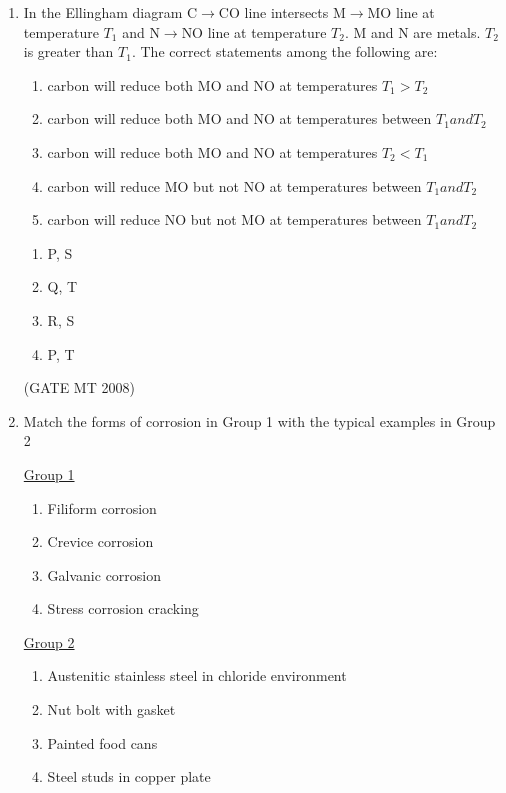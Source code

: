 \documentclass[11pt, letterpaper]{article}
\theoremstyle{remark}
\begin{document}
\begin{enumerate}
\item In the Ellingham diagram C$\rightarrow$CO line intersects M$\rightarrow$MO line at temperature $T_1$ and N$\rightarrow$NO line at temperature $T_2$. M and N are metals. $T_2$ is greater than $T_1$. The correct statements among the following are:
\begin{enumerate}[label=(\MakeUppercase{\alph*}), start= 16]
\item carbon will reduce both MO and NO at temperatures $T_1 > T_2$
\item carbon will reduce both MO and NO at temperatures between $T_1 and T_2$
\item carbon will reduce both MO and NO at temperatures $T_2 < T_1$
\item carbon will reduce MO but not NO at temperatures between $T_1 and T_2$
\item carbon will reduce NO but not MO at temperatures between $T_1 and T_2$
\end{enumerate}

\begin{multicols}{2}
\begin{enumerate} 
\item P, S
\item Q, T
\item R, S
\item P, T
\end{enumerate}
\end{multicols}
\hfill(GATE MT 2008)

\item Match the forms of corrosion in Group 1 with the typical examples in Group 2
\begin{multicols}{2}
\underline{Group 1}
\begin{enumerate}[label=(\Alph*), start=16]
\item Filiform corrosion  
\item Crevice corrosion
\item Galvanic corrosion
\item Stress corrosion cracking 
\end{enumerate}

\underline{Group 2}
\begin{enumerate}[label=(\arabic*), start=1]
\item Austenitic stainless steel in chloride environment
\item Nut bolt with gasket
\item Painted food cans
\item Steel studs in copper plate
\end{enumerate}
\end{multicols}


\end{enumerate}
\end{document}

